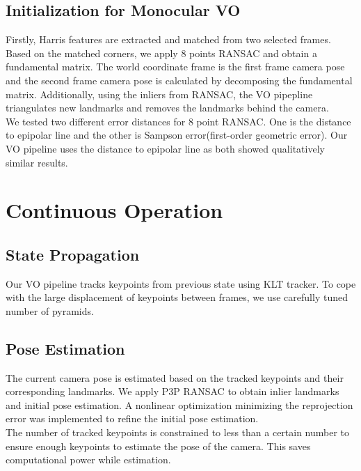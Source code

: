 \subsection*{Initialization for Monocular VO} \label{sec:init_mono}

 Firstly, Harris features are extracted and matched from two selected frames. Based on the matched corners, we apply 8 points RANSAC and obtain a fundamental matrix. The world coordinate frame is the first frame camera pose and the second frame camera pose is calculated by decomposing the fundamental matrix. Additionally, using the inliers from RANSAC, the VO pipepline triangulates new landmarks and removes the landmarks behind the camera. \\
We tested two different error distances for 8 point RANSAC. One is the distance to epipolar line and the other is Sampson error(first-order geometric error). Our VO pipeline uses the distance to epipolar line as both showed qualitatively similar results.

\section{Continuous Operation}\label{sec:continous_operation}
\subsection*{State Propagation}

Our VO pipeline tracks keypoints from previous state using KLT tracker. To cope with the large displacement of keypoints between frames, we use carefully tuned number of pyramids.

\subsection*{Pose Estimation}
The current camera pose is estimated based on the tracked keypoints and their corresponding landmarks. We apply P3P RANSAC to obtain inlier landmarks and initial pose estimation. A nonlinear optimization minimizing the reprojection error was implemented to refine the initial pose estimation. \\
The number of tracked keypoints is constrained to less than a certain number to ensure enough keypoints to estimate the pose of the camera. This saves computational power while estimation.

